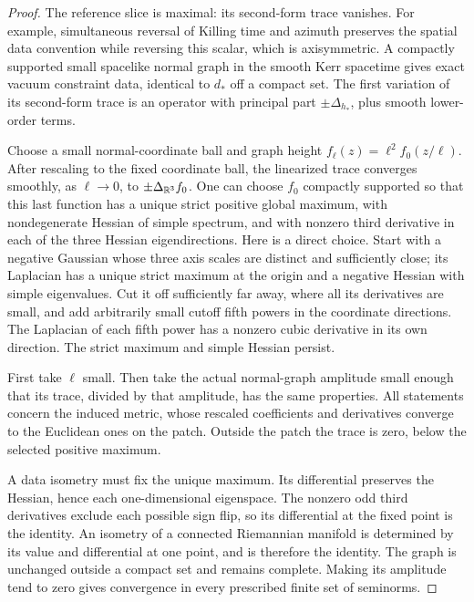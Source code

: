 \begin{proof}
The reference slice is maximal: its second-form trace vanishes.
For example, simultaneous reversal of Killing time and azimuth
preserves the spatial data convention while reversing this scalar,
which is axisymmetric. A compactly supported small spacelike
normal graph in the smooth Kerr spacetime gives exact vacuum
constraint data, identical to \(d_*\) off a compact set. The first
variation of its second-form trace is an operator with principal
part \(\pm\Delta_{h_*}\), plus smooth lower-order terms.

Choose a small normal-coordinate ball and graph height
\(f_\ell(z)=\ell^2f_0(z/\ell)\).
After rescaling to the fixed coordinate ball, the linearized trace
converges smoothly, as \(\ell\to0\), to
\(\pm\Delta_{\mathbb R^3}f_0\).
One can choose \(f_0\) compactly supported so that this last
function has a unique strict positive global maximum, with
nondegenerate Hessian of simple spectrum, and with nonzero third
derivative in each of the three Hessian eigendirections.
Here is a direct choice. Start with a negative Gaussian whose three
axis scales are distinct and sufficiently close; its Laplacian has
a unique strict maximum at the origin and a negative Hessian with
simple eigenvalues. Cut it off sufficiently far away, where all
its derivatives are small, and add arbitrarily small cutoff fifth
powers in the coordinate directions. The Laplacian of each fifth
power has a nonzero cubic derivative in its own direction. The
strict maximum and simple Hessian persist.

First take \(\ell\) small. Then take the actual normal-graph
amplitude small enough that its trace, divided by that amplitude,
has the same properties. All statements concern the induced
metric, whose rescaled coefficients and derivatives converge to
the Euclidean ones on the patch. Outside the patch the trace
is zero, below the selected positive maximum.

A data isometry must fix the unique maximum. Its differential
preserves the Hessian, hence each one-dimensional eigenspace.
The nonzero odd third derivatives exclude each possible sign
flip, so its differential at the fixed point is the identity.
An isometry of a connected Riemannian manifold is determined by
its value and differential at one point, and is therefore the
identity. The graph is unchanged outside a compact set and remains
complete. Making its amplitude tend to zero gives convergence in
every prescribed finite set of seminorms.
\end{proof}


